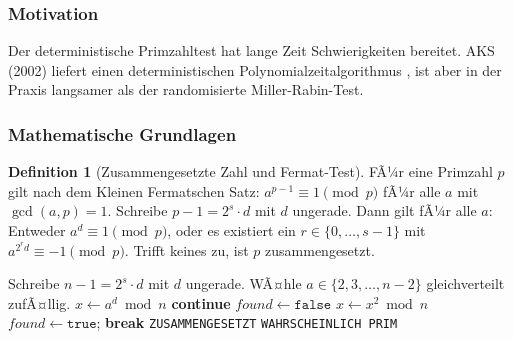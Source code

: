 ﻿\documentclass[12pt,a4paper]{article}
\theoremstyle{definition}
\newtheorem{definition}{Definition}[section]
\theoremstyle{plain}
\theoremstyle{remark}
\begin{document}
\subsubsection{Motivation}

Der deterministische Primzahltest hat lange Zeit Schwierigkeiten bereitet.
AKS (2002) liefert einen deterministischen Polynomialzeitalgorithmus
\cite{agrawal2004primes}, ist aber in der Praxis langsamer als der
randomisierte Miller-Rabin-Test.

\subsubsection{Mathematische Grundlagen}

\begin{definition}[Zusammengesetzte Zahl und Fermat-Test]\label{def:fermat}
  FÃ¼r eine Primzahl $p$ gilt nach dem Kleinen Fermatschen Satz:
  $a^{p-1} \equiv 1 \pmod{p}$ fÃ¼r alle $a$ mit $\gcd(a,p)=1$.
  Schreibe $p - 1 = 2^s \cdot d$ mit $d$ ungerade. Dann gilt fÃ¼r alle $a$:
  Entweder $a^d \equiv 1 \pmod{p}$, oder es existiert ein $r \in \{0,\ldots,s-1\}$
  mit $a^{2^r d} \equiv -1 \pmod{p}$.
  Trifft keines zu, ist $p$ zusammengesetzt.
\end{definition}

\begin{algorithm}[H]
  \caption{Miller-Rabin-Primzahltest}
  \label{alg:miller}
  \begin{algorithmic}[1]
    \State Schreibe $n - 1 = 2^s \cdot d$ mit $d$ ungerade.
      \State WÃ¤hle $a \in \{2, 3, \ldots, n-2\}$ gleichverteilt zufÃ¤llig.
      \State $x \gets a^d \bmod n$ 
        \State \textbf{continue}
      \EndIf
      \State $\mathit{found} \gets \texttt{false}$
        \State $x \gets x^2 \bmod n$
          \State $\mathit{found} \gets \texttt{true}$; \textbf{break}
        \EndIf
      \EndFor
        \State \Return \texttt{ZUSAMMENGESETZT}
      \EndIf
    \EndFor
    \State \Return \texttt{WAHRSCHEINLICH PRIM}
  \end{algorithmic}
\end{algorithm}
\end{document}
